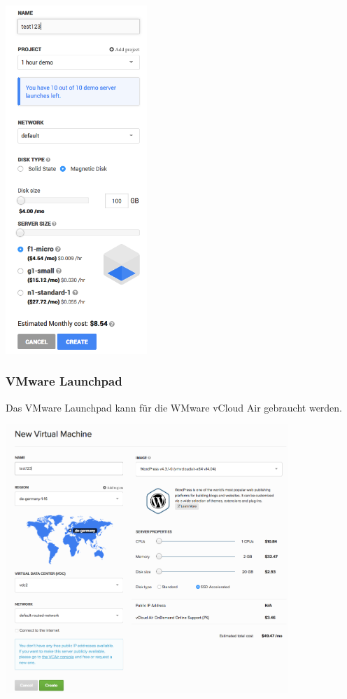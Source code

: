 \includegraphics[width=0.4\textwidth]{./03_Analyse/03_Bitnami/images/google_instancereation}


\subsubsection{VMware Launchpad}
Das VMware Launchpad kann für die WMware vCloud Air gebraucht werden.

\includegraphics[width=0.8\textwidth]{./03_Analyse/03_Bitnami/images/vmware_creation}


